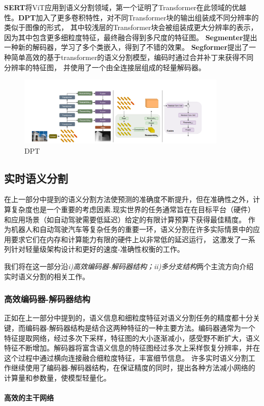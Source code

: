 \documentclass[11pt]{article}
\begin{document}
\textbf{SERT}\cite{ser}将ViT应用到语义分割领域，第一个证明了Transformer在此领域的优越性。\textbf{DPT}\cite{dpt}加入了更多卷积特性，对不同Transformer块的输出组装成不同分辨率的类似于图像的形式，
其中较浅层的Transformer块会被组装成更大分辨率的表示，因为其中包含更多细粒度特征，最终融合得到多尺度的特征图。
\textbf{Segmenter}\cite{segm}提出一种新的解码器，学习了多个类嵌入，得到了不错的效果。
\textbf{Segformer}\cite{segf}提出了一种简单高效的基于transformer的语义分割模型，编码时通过合并补丁来获得不同分辨率的特征图，
并使用了一个由全连接层组成的轻量解码器。

\begin{figure}[H]
    \centering
    \includegraphics[width=10cm]{dpt.png}
    \caption{DPT\cite{dpt}}
\end{figure}
\subsection{实时语义分割}
在上一部分中提到的语义分割方法使预测的准确度不断提升，但在准确性之外，计算复杂度也是一个重要的考虑因素.现实世界的任务通常旨在在目标平台（硬件）和应用场景（如自动驾驶需要低延迟）给定的有限计算预算下获得最佳精度。
作为机器人和自动驾驶汽车等复杂任务的重要一环，语义分割在许多实际情景中的应用要求它们在内存和计算能力有限的硬件上以非常低的延迟运行，
这激发了一系列针对轻量级架构设计和更好的速度-准确性权衡的工作。

我们将在这一部分沿\textit{i)高效编码器-解码器结构；ii)多分支结构}两个主流方向介绍实时语义分割的相关工作。
\subsubsection{高效编码器-解码器结构}
正如在上一部分中提到的，语义信息和细粒度特征对语义分割任务的精度都十分关键，而编码器-解码器结构是结合这两种特征的一种主要方法。编码器通常为一个特征提取网络，经过多次下采样，特征图的大小逐渐减小，感受野不断扩大，语义特征不断增加。解码器将富含语义信息的特征图经过多次上采样恢复分辨率，并在这个过程中通过横向连接融合细粒度特征，丰富细节信息。
许多实时语义分割工作继续使用了编码器-解码器结构，在保证精度的同时，提出各种方法减小网络的计算量和参数量，使模型轻量化。
\paragraph{高效的主干网络}
\end{document}
